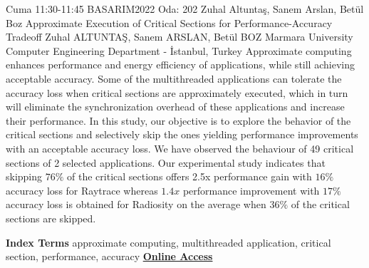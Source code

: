 
    \begin{abstract_basarim}
    {Cuma 11:30-11:45}
    {BASARIM2022}
    {Oda: 202}
    {Zuhal Altuntaş, Sanem Arslan, Betül Boz}
    {Approximate Execution of Critical Sections for Performance-Accuracy Tradeoff}
    {%
    Zuhal ALTUNTAŞ, Sanem ARSLAN, Betül BOZ}
    {%
    }
    {%
    Marmara University Computer Engineering Department - İstanbul, Turkey}
    Approximate computing enhances performance and energy efficiency of applications, while still achieving acceptable accuracy. Some of the multithreaded applications can tolerate the accuracy loss when critical sections are approximately executed, which in turn will eliminate the synchronization overhead of these applications and increase their performance. In this study, our objective is to explore the behavior of the critical sections and selectively skip the ones yielding performance improvements with an acceptable accuracy loss. We have observed the behaviour of 49 critical sections of 2 selected applications. Our experimental study indicates that skipping $76 \%$ of the critical sections offers 2.5x performance gain with $16 \%$ accuracy loss for Raytrace whereas $1.4 x$ performance improvement with $17 \%$ accuracy loss is obtained for Radiosity on the average when $36 \%$ of the critical sections are skipped. 
    
            \textbf{Index Terms} \newline{}approximate computing, multithreaded application, critical section, performance, accuracy
     \newline\newline\noindent \href{https://drive.google.com/file/d/1ZlPHw7wj9RfF-Qn_XKueCL8wqkUxazy5/view?usp=drivesdk}{\bfseries Online Access}
    \end{abstract_basarim}
    